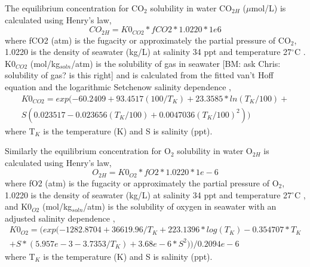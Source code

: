 \documentclass{ruthesis}
\begin{document}
The equilibrium concentration for CO$_2$ solubility in water CO$_{2H}$ ($\mu$mol/L) is calculated using Henry's law,
\begin{equation}
CO_{2H}=K0_{CO2}*fCO2*1.0220*1e6
\end{equation}
where fCO2 (atm) is the fugacity or approximately the partial pressure of CO$_2$, 1.0220 is the density of seawater (kg/L) at salinity 34 ppt and temperature 27$^{\circ}$C \cite{ramsing2011seawater} \cite{greensberg1992standard}. K0$_{CO2}$ (mol/kg$_{soln}$/atm) is the solubility of gas in seawater [BM: ask Chris: solubility of gas? is this right] and is calculated from the fitted van't Hoff equation and the logarithmic Setchenow salinity dependence \cite{weiss1974carbon},
\begin{equation}
\begin{aligned}
K0_{CO2} = exp(- 60.2409 + 93.4517(100/T_K)  + 23.3585*ln(T_K/100)+ \\
S(0.023517 - 0.023656(T_K/100) + 0.0047036(T_K/100)^2))
\end{aligned}
\end{equation}
where T$_K$ is the temperature (K) and S is salinity (ppt).




Similarly the equilibrium concentration for O$_2$ solubility in water O$_{2H}$ is calculated using Henry's law,
\begin{equation}
O_{2H}=K0_{O2}*fO2*1.0220*1e-6
\end{equation}
where fO2 (atm) is the fugacity or approximately the partial pressure of O$_2$, 1.0220 is the density of seawater (kg/L) at salinity 34 ppt and temperature 27$^{\circ}$C \cite{ramsing2011seawater} \cite{greensberg1992standard}, and K0$_{O2}$ (mol/kg$_{soln}$/atm) is the solubility of oxygen in seawater with an adjusted salinity dependence \cite{battino1983solubility},
\begin{equation}
\begin{aligned}
K0_{O2} =  (exp(-1282.8704 + 36619.96/T_K + 223.1396*log(T_K) -0.354707*T_K \\
+ S*(5.957e-3 -3.7353/T_K) + 3.68e-6*S^2))/0.2094e-6
\end{aligned}
\end{equation}
where T$_K$ is the temperature (K) and S is salinity (ppt).
\end{document}
